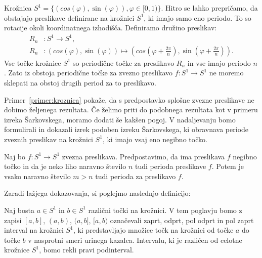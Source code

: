 \documentclass[../TG_magistrsko_delo_sections.tex]{subfiles}
\begin{document}
\begin{primer}\label{primer:kroznica}
Krožnica $S^1 = \{ (cos(\varphi), \sin(\varphi)), \varphi \in [0, 1) \}$. Hitro se lahko prepričamo, da obstajajo preslikave definirane na krožnici $S^1$, ki imajo samo eno periodo. To so rotacije okoli koordinatnega izhodišča. Definiramo družino preslikav: 
\begin{equation*} %
\begin{split}
R_n &: S^1 \to S^1, \\ 
R_n &: (cos(\varphi), \sin(\varphi)) \mapsto (cos(\varphi + \frac{2 \pi}{n}), \sin(\varphi + \frac{2 \pi}{n})).
\end{split}
\end{equation*}
Vse točke krožnice $S^1$ so periodične točke za preslikavo $R_n$ in vse imajo periodo $n$. Zato iz obstoja periodične točke za zvezno preslikavo $f : S^1 \to S^1$ ne moremo sklepati na obstoj drugih period za to preslikavo.
\end{primer}

Primer~\ref{primer:kroznica} pokaže, da s predpostavko splošne zvezne preslikave ne dobimo željenega rezultata. Če želimo priti do podobnega rezultata kot v primeru izreka Šarkovskega, moramo dodati še kakšen pogoj. V nadaljevanju bomo formulirali in dokazali izrek podoben izreku Šarkovskega, ki obravnava periode zveznih preslikav na krožnici $S^1$, ki imajo vsaj eno negibno točko.

\begin{izrek}\label{izr:sarkovski_kroznica}
Naj bo $f : S^1 \to S^1$ zvezna preslikava. Predpostavimo, da ima preslikava $f$ negibno točko in da je neko liho naravno število $n$ tudi perioda preslikave $f$. Potem je vsako naravno število $m > n$ tudi perioda za preslikavo $f$.
\end{izrek}

Zaradi lažjega dokazovanja, si poglejmo naslednjo definicijo:
\begin{definicija}\label{def:kintervali}
Naj bosta $a \in S^1$ in $b \in S^1$ različni točki na krožnici. V tem poglavju bomo z zapisi $[a, b]$, $(a, b)$, $(a, b]$, $[a, b)$ označevali zaprt, odprt, pol odprt in pol zaprt interval na krožnici $S^1$, ki predstavljajo množice točk na krožnici od točke $a$ do točke $b$ v nasprotni smeri urinega kazalca. Intervalu, ki je različen od celotne krožnice $S^1$, bomo rekli pravi podinterval.
\end{definicija}
\end{document}
